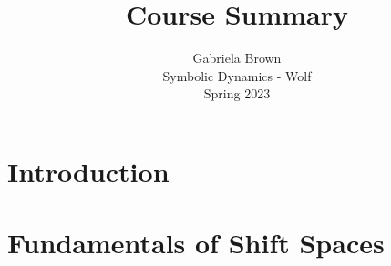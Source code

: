 \documentclass[11pt, reqno]{amsart}
\title{Course Summary}
\author{Gabriela Brown\\ Symbolic Dynamics - Wolf \\ Spring 2023}
\theoremstyle{plain}
\numberwithin{thm}{subsection}
\theoremstyle{definition}
\begin{document}
\maketitle

 {
  \setlength{\parskip}{4.4pt}   
  \tableofcontents
 }


\section{Introduction}

\section{Fundamentals of Shift Spaces}







\end{document}
